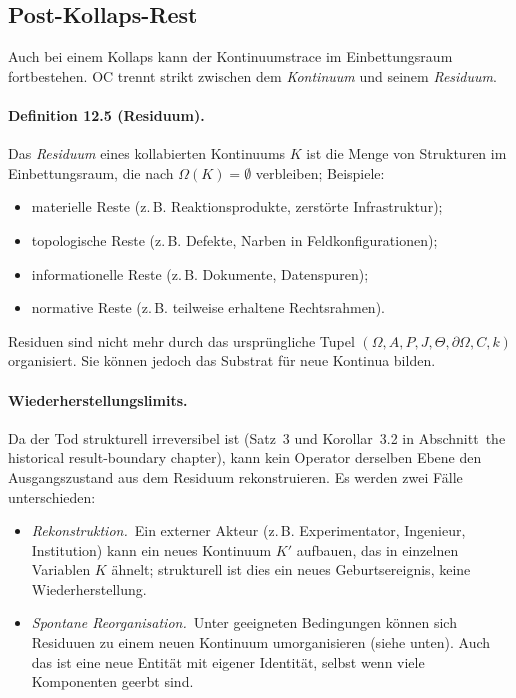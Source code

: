 \subsection{Post-Kollaps-Rest}

Auch bei einem Kollaps kann der Kontinuumstrace im Einbettungsraum fortbestehen.
OC trennt strikt zwischen dem \emph{Kontinuum} und seinem
\emph{Residuum}.

\paragraph{Definition 12.5 (Residuum).}
Das \emph{Residuum} eines kollabierten Kontinuums \(K\) ist die Menge von
Strukturen im Einbettungsraum, die nach \(\Omega(K)=\emptyset\) verbleiben; Beispiele:
\begin{itemize}
  \item materielle Reste (z.\,B. Reaktionsprodukte, zerstörte Infrastruktur);
  \item topologische Reste (z.\,B. Defekte, Narben in Feldkonfigurationen);
  \item informationelle Reste (z.\,B. Dokumente, Datenspuren);
  \item normative Reste (z.\,B. teilweise erhaltene Rechtsrahmen).
\end{itemize}

Residuen sind nicht mehr durch das ursprüngliche Tupel
\((\Omega,A,P,J,\Theta,\partial\Omega,C,k)\) organisiert. Sie können jedoch das
Substrat für neue Kontinua bilden.

\paragraph{Wiederherstellungslimits.}
Da der Tod strukturell irreversibel ist (Satz~3 und Korollar~3.2 in
Abschnitt~the historical result-boundary chapter), kann kein Operator derselben Ebene den
Ausgangszustand aus dem Residuum rekonstruieren. Es werden zwei Fälle
unterschieden:
\begin{itemize}
  \item \emph{Rekonstruktion.}\
        Ein externer Akteur (z.\,B. Experimentator, Ingenieur, Institution)
        kann ein neues Kontinuum \(K'\) aufbauen, das in einzelnen Variablen
        \(K\) ähnelt; strukturell ist dies ein neues Geburtsereignis, keine
        Wiederherstellung.
  \item \emph{Spontane Reorganisation.}\
        Unter geeigneten Bedingungen können sich Residuuen zu einem neuen
        Kontinuum umorganisieren (siehe unten). Auch das ist eine neue
        Entität mit eigener Identität, selbst wenn viele Komponenten geerbt sind.
\end{itemize}

